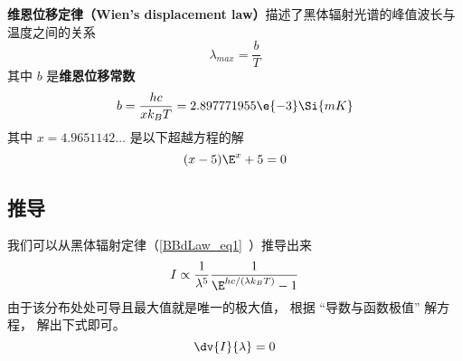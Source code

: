 

\textbf{维恩位移定律（Wien's displacement law）}描述了黑体辐射光谱的峰值波长与温度之间的关系
\begin{equation}
\lambda_{max} = \frac{b}{T}
\end{equation}
其中 $b$ 是\textbf{维恩位移常数}
\begin{equation}
b = \frac{hc}{xk_B T} = 2.897771955\e{-3} \Si{mK}
\end{equation}
其中 $x = 4.9651142\dots$ 是以下超越方程的解
\begin{equation}
(x-5)\E^x + 5 = 0
\end{equation}

\subsection{推导}

我们可以从黑体辐射定律（\autoref{BBdLaw_eq1}~）推导出来
\begin{equation}
I \propto \frac{1}{\lambda^5} \frac{1}{\E^{hc/(\lambda k_B T)} - 1}
\end{equation}
由于该分布处处可导且最大值就是唯一的极大值， 根据 “导数与函数极值” 解方程， 解出下式即可。
\begin{equation}
\dv{I}{\lambda} = 0
\end{equation}
